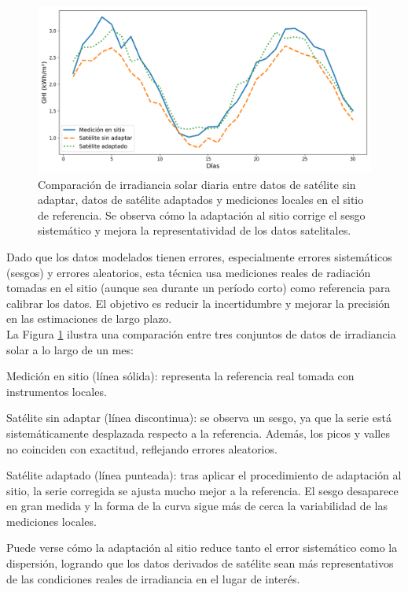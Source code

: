 \begin{figure}
    \centering
    \includegraphics[width=0.97\linewidth]{figuras/SiteAdapation-Example.png}
    \caption{Comparación de irradiancia solar diaria entre datos de satélite sin adaptar, datos de satélite adaptados y mediciones locales en el sitio de referencia. Se observa cómo la adaptación al sitio corrige el sesgo sistemático y mejora la representatividad de los datos satelitales.}
    \label{fig:example}
\end{figure}


Dado que los datos modelados tienen errores, especialmente errores sistemáticos (sesgos) y errores aleatorios, esta técnica usa mediciones reales de radiación tomadas en el sitio (aunque sea durante un período corto) como referencia para calibrar los datos. El objetivo es reducir la incertidumbre y mejorar la precisión en las estimaciones de largo plazo.\\

La Figura \ref{fig:example}  ilustra una comparación entre tres conjuntos de datos de irradiancia solar a lo largo de un mes:

Medición en sitio (línea sólida): representa la referencia real tomada con instrumentos locales.

Satélite sin adaptar (línea discontinua): se observa un sesgo, ya que la serie está sistemáticamente desplazada respecto a la referencia. Además, los picos y valles no coinciden con exactitud, reflejando errores aleatorios.

Satélite adaptado (línea punteada): tras aplicar el procedimiento de adaptación al sitio, la serie corregida se ajusta mucho mejor a la referencia. El sesgo desaparece en gran medida y la forma de la curva sigue más de cerca la variabilidad de las mediciones locales.

Puede verse cómo la adaptación al sitio reduce tanto el error sistemático como la dispersión, logrando que los datos derivados de satélite sean más representativos de las condiciones reales de irradiancia en el lugar de interés.\\


